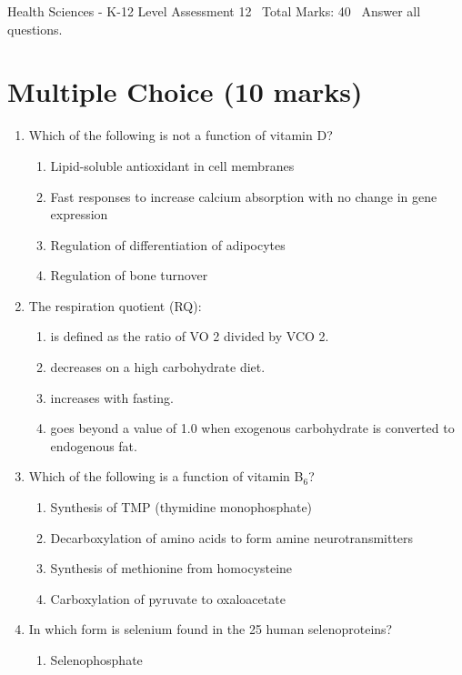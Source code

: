 \documentclass[12pt]{article}
\begin{document}
\begin{center}
Health Sciences - K-12 Level Assessment 12 \
Total Marks: 40 \
Answer all questions.
\end{center}

\section*{Multiple Choice (10 marks)}
\begin{enumerate}[label=\arabic*.]
\item Which of the following is not a function of vitamin D?
\begin{enumerate}[label=(\alph*)]
    \item Lipid-soluble antioxidant in cell membranes
    \item Fast responses to increase calcium absorption with no change in gene expression
    \item Regulation of differentiation of adipocytes
    \item Regulation of bone turnover
\end{enumerate}
\item The respiration quotient (RQ):
\begin{enumerate}[label=(\alph*)]
    \item is defined as the ratio of VO 2 divided by VCO 2.
    \item decreases on a high carbohydrate diet.
    \item increases with fasting.
    \item goes beyond a value of 1.0 when exogenous carbohydrate is converted to endogenous fat.
\end{enumerate}
\item Which of the following is a function of vitamin B$_{6}$?
\begin{enumerate}[label=(\alph*)]
    \item Synthesis of TMP (thymidine monophosphate)
    \item Decarboxylation of amino acids to form amine neurotransmitters
    \item Synthesis of methionine from homocysteine
    \item Carboxylation of pyruvate to oxaloacetate
\end{enumerate}
\item In which form is selenium found in the 25 human selenoproteins?
\begin{enumerate}[label=(\alph*)]
    \item Selenophosphate

\end{enumerate}
\end{enumerate}
\end{document}
